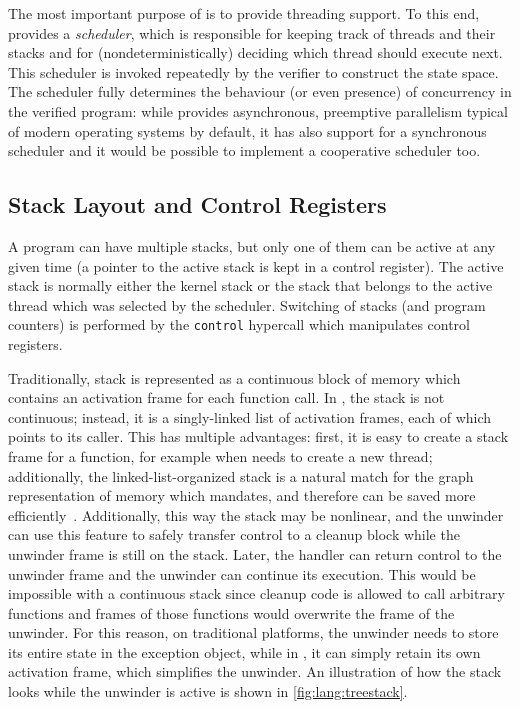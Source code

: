 The most important purpose of \dios{} is to provide threading support. To
this end, \dios{} provides a \emph{scheduler}, which is responsible for
keeping track of threads and their stacks and for (nondeterministically)
deciding which thread should execute next. This scheduler is invoked
repeatedly by the verifier to construct the state space. The scheduler
fully determines the behaviour (or even presence) of concurrency in the
verified program: while \dios{} provides asynchronous, preemptive
parallelism typical of modern operating systems by default, it has also support
for a synchronous scheduler and it would be possible to implement a
cooperative scheduler too.

\subsection{Stack Layout and Control Registers}\label{sec:lang:stack-layout}

A \divm{} program can have multiple stacks, but only one of them can be
active at any given time (a pointer to the active stack is kept in a
\divm{} control register). The active stack is normally either the kernel
stack or the stack that belongs to the active thread which was selected
by the scheduler. Switching of stacks (and program counters) is
performed by the \texttt{control} hypercall which manipulates \divm{}
control registers.

Traditionally, stack is represented as a continuous block of memory
which contains an activation frame for each function call. In \divm{}, the
stack is not continuous; instead, it is a singly-linked list of
activation frames, each of which points to its caller. This has multiple
advantages: first, it is easy to create a stack frame for a function,
for example when \dios{} needs to create a new thread; additionally, the
linked-list-organized stack is a natural match for the graph
representation of memory which \divm{} mandates, and therefore can be saved
more efficiently~. Additionally, this way the stack
may be nonlinear, and the unwinder can use this feature to safely
transfer control to a cleanup block while the unwinder frame is still on
the stack. Later, the handler can return control to the unwinder frame
and the unwinder can continue its execution. This would be impossible
with a continuous stack since cleanup code is allowed to call arbitrary
functions and frames of those functions would overwrite the frame of the
unwinder. For this reason, on traditional platforms, the unwinder needs
to store its entire state in the exception object, while in \divm{}, it can
simply retain its own activation frame, which simplifies the unwinder.
An illustration of how the stack looks while the unwinder is active is shown in
\autoref{fig:lang:treestack}.

